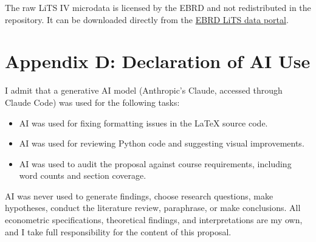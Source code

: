 \documentclass[11pt,a4paper]{article}
\begin{document}
\noindent The raw LiTS IV microdata is licensed by the EBRD and not redistributed in the
repository. It can be downloaded directly from the
\href{https://www.ebrd.com/what-we-do/economic-research-and-data/data/lits.html}{EBRD LiTS data portal}.

\vspace{6em}
\section*{Appendix D: Declaration of AI Use}

I admit that a generative AI model (Anthropic's Claude, accessed through Claude Code)
was used for the following tasks:

\begin{itemize}[leftmargin=18pt,itemsep=2pt]
    \item AI was used for fixing formatting issues in the \LaTeX{} source code.
    \item AI was used for reviewing Python code and suggesting visual improvements.
    \item AI was used to audit the proposal against course requirements, including
    word counts and section coverage.
\end{itemize}

\noindent AI was never used to generate findings, choose research questions, make
hypotheses, conduct the literature review, paraphrase, or make conclusions. All
econometric specifications, theoretical findings, and interpretations are my own, and
I take full responsibility for the content of this proposal.
\end{document}
